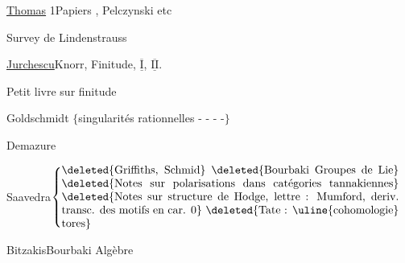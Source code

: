 \uline{Thomas} 1\qquad Papiers , Pelczynski etc

Survey de Lindenstrauss \unsure{---|--}

\uline{Jurchescu}\qquad Knorr, Finitude, $\overline{\underline{\mathrm I}}$, $\overline{\underline{\mathrm {II}}}$.

Petit livre sur finitude

Goldschmidt\qquad {} $\{$singularités rationnelles - - - -$\}$

\qquad {}

\clearpage
\normalmarginpar










Demazure\qquad {}

Saavedra\quad \(\left\{\vcenter{\hbox{\begin{minipage}{.87\linewidth}
\deleted{Griffiths, Schmid}

\deleted{Bourbaki Groupes de Lie}

\deleted{Notes sur polarisations dans catégories tannakiennes}

\deleted{Notes sur structure de Hodge, lettre : Mumford, deriv. transc. des motifs en car. 0}

\deleted{Tate : \uline{cohomologie} tores}
\end{minipage}}}\right.\)

Bitzakis\qquad Bourbaki Algèbre



